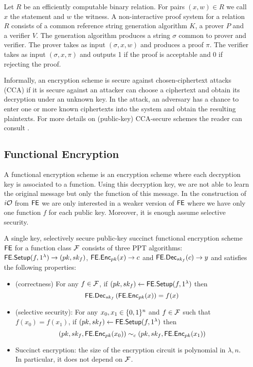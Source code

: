 Let $R$ be an efficiently computable binary relation. For pairs $(x, w) \in R$ we call $x$ the statement and $w$ the witness. A non-interactive proof system \cite{blum1988non} for a relation $R$ consists of a common reference string generation algorithm $K$, a prover $P$ and a verifier $V$. The generation algorithm produces a string $\sigma$ common to prover and verifier.
The prover takes as input $(\sigma, x, w)$ and produces a proof $\pi$. The verifier takes as input $(\sigma, x, \pi)$ and outputs 1 if the proof is acceptable and 0 if rejecting the proof.

Informally, an encryption scheme is secure against chosen-ciphertext attacks (CCA) if it is secure against an attacker can choose a ciphertext and obtain its decryption under an unknown key. In the attack, an adversary has a chance to enter one or more known ciphertexts into the system and obtain the resulting plaintexts.
For more details on (public-key) CCA-secure schemes the reader can consult \cite{katz2014introduction}.


\subsection{Functional Encryption}
A functional encryption scheme is an encryption scheme where each decryption key is associated to a function. Using this decryption key, we are not able to learn the original message but only the function of this message. In the construction of $i\mathcal{O}$ from $\mathsf{FE}$ we are only interested in a weaker version of $\mathsf{FE}$ where we have only one function $f$ for each public key. Moreover, it is enough assume selective security.
\begin{mydef}
A single key, selectively secure public-key succinct functional encryption scheme $\mathsf{FE}$ for a function class $\mathcal{F}$ consists of three PPT algorithms: $\mathsf{FE.Setup}(f,1^\lambda)\to(pk,sk_f)$, $\mathsf{FE.Enc}_{pk}(x)\to c$ and $\mathsf{FE.Dec}_{sk_f}(c) \to y$ and satisfies the following properties:
\begin{itemize}
\item (correctness) For any $f\in\mathcal{F}$, if $(pk,sk_f)\gets\mathsf{FE.Setup}(f,1^\lambda)$ then
\[
\mathsf{FE.Dec}_{sk_f}\left(\mathsf{FE.Enc}_{pk}(x)\right)=f(x)
\]
\item (selective security): For any $x_0,x_1\in\{0,1\}^n$ and $f\in\mathcal{F}$ such that $f(x_0)=f(x_1)$, if $(pk,sk_f)\gets\mathsf{FE.Setup}(f,1^\lambda)$ then
\[
\left(pk,sk_f,\mathsf{FE.Enc}_{pk}(x_0)\right)\sim_c \left(pk,sk_f,\mathsf{FE.Enc}_{pk}(x_1)\right)
\]
\item Succinct encryption: the size of the encryption circuit is polynomial in $\lambda,n$. In particular, it does not depend on $\mathcal{F}$.
\end{itemize}
\end{mydef}



